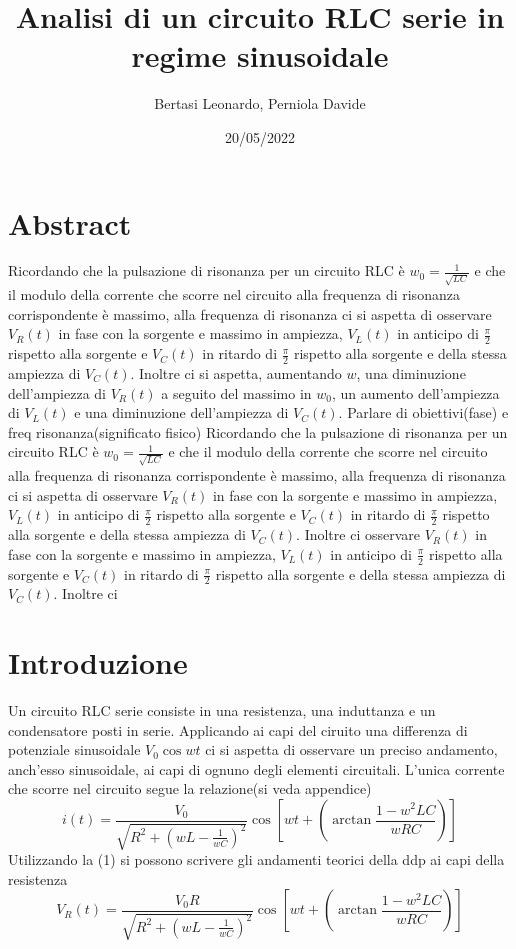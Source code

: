 \documentclass{article}
\title{Analisi di un circuito RLC serie in regime sinusoidale}
\date{20/05/2022}
\author{Bertasi Leonardo, Perniola Davide}
\begin{document}
\maketitle
\section{Abstract} 
Ricordando che la pulsazione di risonanza per un circuito RLC è $w_0=\frac{1}{\sqrt{LC}}$ e che il modulo della corrente che scorre nel circuito alla frequenza di risonanza corrispondente è massimo, alla frequenza di risonanza ci si aspetta di 
osservare $V_R(t)$ in fase con la sorgente e massimo in ampiezza, $V_L(t)$ in anticipo di $\frac{\pi}{2}$ rispetto alla sorgente e $V_C(t)$ in ritardo di $\frac{\pi}{2}$ rispetto alla sorgente e della stessa ampiezza di  $V_C(t)$. Inoltre ci 
si aspetta, aumentando $w$, una diminuzione dell'ampiezza di $V_R(t)$ a seguito del massimo in $w_0$, un aumento dell'ampiezza di  $V_L(t)$
e una diminuzione dell'ampiezza di $V_C(t)$. Parlare di obiettivi(fase) e freq risonanza(significato fisico)
Ricordando che la pulsazione di risonanza per un circuito RLC è $w_0=\frac{1}{\sqrt{LC}}$ e che il modulo della corrente che scorre nel circuito alla frequenza di risonanza corrispondente è massimo, alla frequenza di risonanza ci si aspetta di 
osservare $V_R(t)$ in fase con la sorgente e massimo in ampiezza, $V_L(t)$ in anticipo di $\frac{\pi}{2}$ rispetto alla sorgente e $V_C(t)$ in ritardo di $\frac{\pi}{2}$ rispetto alla sorgente e della stessa ampiezza di  $V_C(t)$. Inoltre ci 
osservare $V_R(t)$ in fase con la sorgente e massimo in ampiezza, $V_L(t)$ in anticipo di $\frac{\pi}{2}$ rispetto alla sorgente e $V_C(t)$ in ritardo di $\frac{\pi}{2}$ rispetto alla sorgente e della stessa ampiezza di  $V_C(t)$. Inoltre ci 


\section{Introduzione} 
Un circuito RLC serie consiste in una resistenza, una induttanza e un condensatore posti in serie. Applicando ai capi del ciruito una differenza di potenziale sinusoidale $V_{0}\cos{wt} $ ci si aspetta di osservare un preciso andamento, anch'esso sinusoidale,
 ai capi di ognuno degli elementi circuitali. L'unica corrente che scorre nel circuito segue la relazione(si veda appendice) 
\begin{equation}
  i(t)=\frac{V_{0}}{\sqrt{R^2+(wL-\frac{1}{wC})^2}}\cos{[wt+(\arctan{\frac{1-w^2LC}{wRC}})]}
\end{equation}
Utilizzando la (1) si possono scrivere gli andamenti teorici della ddp ai capi della resistenza
\begin{equation}
 V_{R}(t)= \frac{V_{0}R}{\sqrt{R^2+(wL-\frac{1}{wC})^2}}\cos{[wt+(\arctan{\frac{1-w^2LC}{wRC}})]}
\end{equation}
\end{document}
